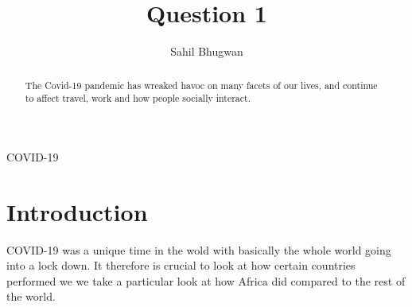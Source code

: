 \documentclass[12pt,preprint, authoryear]{elsarticle}
\numberwithin{equation}{section}
\numberwithin{figure}{section}
\numberwithin{table}{section}
\begin{document}
\begin{frontmatter}  %

\title{Question 1}





\author[Add1]{Sahil Bhugwan}
\ead{}





\address[Add1]{Github-\url{https://github.com/SBhugwan}}


\begin{abstract}
\small{
The Covid-19 pandemic has wreaked havoc on many facets of our lives, and
continue to affect travel, work and how people socially interact.
}
\end{abstract}

\vspace{1cm}


\begin{keyword}
\footnotesize{
COVID-19 \\
\vspace{0.3cm}
}
\end{keyword}



\vspace{0.5cm}

\end{frontmatter}



\pagestyle{fancy}
\chead{}
\rhead{}
\lfoot{}
\lhead{}
\cfoot{}


\headsep 35pt %




\hypertarget{introduction}{%
\section{\texorpdfstring{Introduction
\label{Introduction}}{Introduction }}\label{introduction}}

COVID-19 was a unique time in the wold with basically the whole world
going into a lock down. It therefore is crucial to look at how certain
countries performed we we take a particular look at how Africa did
compared to the rest of the world.
\end{document}
